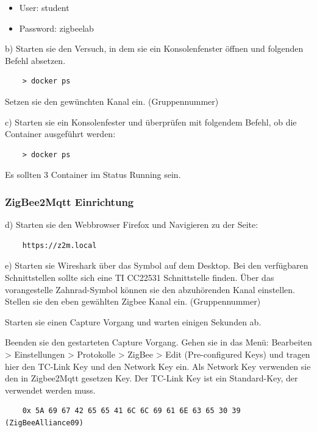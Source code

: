 \begin{itemize}
    \item User: student 
    \item Password: zigbeelab
\end{itemize}

b) Starten sie den Versuch, in dem sie ein Konsolenfenster öffnen und folgenden Befehl absetzen.

\begin{lstlisting}
    > docker ps
\end{lstlisting}

Setzen sie den gewünchten Kanal ein. (Gruppennummer)

c) Starten sie ein Konsolenfester und überprüfen mit folgendem Befehl, ob die Container ausgeführt werden:
\begin{lstlisting}
    > docker ps
\end{lstlisting}

Es sollten 3 Container im Status \grqq Running\grqq{} sein. 

\subsubsection{ZigBee2Mqtt Einrichtung}

d) Starten sie den Webbrowser Firefox und Navigieren zu der Seite:
\begin{lstlisting}
    https://z2m.local
\end{lstlisting}

e) Starten sie Wireshark über das Symbol auf dem Desktop. Bei den verfügbaren Schnittstellen sollte sich eine \grqq TI CC22531\grqq{} Schnittstelle finden. Über das vorangestelle Zahnrad-Symbol können sie den abzuhörenden
 Kanal einstellen. Stellen sie den eben gewählten Zigbee Kanal ein. (Gruppennummer)

Starten sie einen Capture Vorgang und warten einigen Sekunden ab.

Beenden sie den gestarteten Capture Vorgang. Gehen sie in das Menü: Bearbeiten > Einstellungen > Protokolle > ZigBee > Edit (Pre-configured Keys) und tragen
hier den \grqq TC-Link Key\grqq{} und den \grqq Network Key\grqq{} ein. Als \grqq Network Key\grqq{} verwenden sie den in Zigbee2Mqtt gesetzen Key. Der \grqq TC-Link Key\grqq{} ist ein
Standard-Key, der verwendet werden muss.
\begin{lstlisting}
    0x 5A 69 67 42 65 65 41 6C 6C 69 61 6E 63 65 30 39 (ZigBeeAlliance09)
\end{lstlisting}

